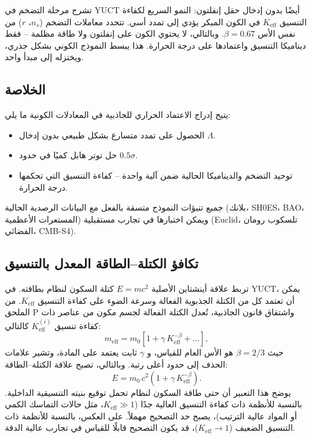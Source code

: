 \documentclass[11pt,a4paper]{article}
\newcommand{\Keff}{K_{\mathrm{eff}}}
\begin{document}
	تشرح مرحلة التضخم في YUCT أيضًا بدون إدخال حقل إنفلتون: النمو السريع لكفاءة التنسيق $\Keff$ في الكون المبكر يؤدي إلى تمدد أسي. تتحدد معاملات التضخم ($n_s$، $r$) من نفس الأس $\beta = 0.67$. وبالتالي، لا يحتوي الكون على إنفلتون ولا طاقة مظلمة – فقط ديناميكا التنسيق واعتمادها على درجة الحرارة. هذا يبسط النموذج الكوني بشكل جذري، ويختزله إلى مبدأ واحد.
	
	\subsection{الخلاصة}
	
	يتيح إدراج الاعتماد الحراري للجاذبية في المعادلات الكونية ما يلي:
	\begin{itemize}
		\item الحصول على تمدد متسارع بشكل طبيعي بدون إدخال $\Lambda$.
		\item حل توتر هابل كميًا في حدود $0.5\sigma$.
		\item توحيد التضخم والديناميكا الحالية ضمن آلية واحدة – كفاءة التنسيق التي تحكمها درجة الحرارة.
	\end{itemize}
	جميع تنبؤات النموذج متسقة بالفعل مع البيانات الرصدية الحالية (بلانك، SH0ES، BAO، المستعرات الأعظمية) ويمكن اختبارها في تجارب مستقبلية (Euclid، تلسكوب رومان الفضائي، CMB-S4).
	
	
	\subsection{تكافؤ الكتلة–الطاقة المعدل بالتنسيق}
	\label{subsec:coord-emc2}
	
	تربط علاقة أينشتاين الأصلية $E = m c^{2}$ كتلة السكون لنظام بطاقته. في YUCT، يمكن أن تعتمد كل من الكتلة الجذبوية الفعالة وسرعة الضوء على كفاءة التنسيق $K_{\mathrm{eff}}$. من الملحق P واشتقاق قانون الجاذبية، تُعدل الكتلة الفعالة لجسم مكون من عناصر ذات كفاءة تنسيق $K_{\mathrm{eff}}^{(i)}$ كالتالي:
	\[
	m_{\mathrm{eff}} = m_{0} \left[ 1 + \gamma \, K_{\mathrm{eff}}^{-\beta} + \dots \right],
	\]
	حيث $\beta = 2/3$ هو الأس العام للقياس، و $\gamma$ ثابت يعتمد على المادة، وتشير علامات الحذف إلى حدود أعلى رتبة. وبالتالي، تصبح علاقة الكتلة–الطاقة:
	\[
	\boxed{E = m_{0} \, c^{2} \left( 1 + \gamma \, K_{\mathrm{eff}}^{-\beta} \right)}.
	\]
	يوضح هذا التعبير أن حتى طاقة السكون لنظام تحمل توقيع بنيته التنسيقية الداخلية. بالنسبة للأنظمة ذات كفاءة التنسيق العالية جدًا ($K_{\mathrm{eff}} \gg 1$، مثل حالات التماسك الكمي أو المواد عالية الترتيب)، يصبح حد التصحيح مهملاً. على العكس، بالنسبة للأنظمة ذات التنسيق الضعيف ($K_{\mathrm{eff}} \to 1$)، قد يكون التصحيح قابلًا للقياس في تجارب عالية الدقة.
	
\end{document}

